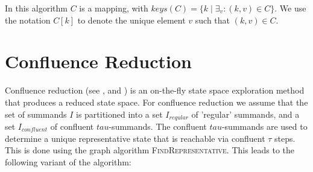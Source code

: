 \documentclass{article}
\begin{document}
In this algorithm $C$ is a mapping, with $keys(C) = \{ k \mid \exists_{v}: (k,v) \in C \}$. We use the notation $C[k]$ to denote the unique element $v$ such that $(k,v) \in C$.

\newpage
\section{Confluence Reduction}

Confluence reduction (see \cite{DBLP:conf/mfcs/GrooteP00}, \cite{Blom01partialt-confluence} and \cite{DBLP:conf/cav/BlomP02}) is an on-the-fly state space exploration method that produces a reduced state space. For confluence reduction we assume that the set of summands $I$ is partitioned into a set $I_{reqular}$ of 'regular' summands, and a set $I_{confluent}$ of confluent $tau$-summands. The confluent $tau$-summands are used to determine a unique representative state that is reachable via confluent $\tau$ steps. This is done using the graph algorithm \textsc{FindRepresentative}. This leads to the following variant of the algorithm:
\end{document}
